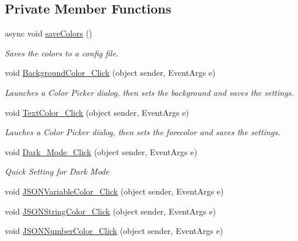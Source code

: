 \subsection*{Private Member Functions}
\begin{DoxyCompactItemize}
\item 
async void \mbox{\hyperlink{class_cert_complete_1_1_preferences_a700e02890b7d9aa6a4425f55c1aee837}{save\+Colors}} ()
\begin{DoxyCompactList}\small\item\em Saves the colors to a config file. \end{DoxyCompactList}\item 
void \mbox{\hyperlink{class_cert_complete_1_1_preferences_a18a2ea14a6e0668ec90c58c17ecf09f2}{Background\+Color\+\_\+\+Click}} (object sender, Event\+Args e)
\begin{DoxyCompactList}\small\item\em Launches a Color Picker dialog, then sets the background and saves the settings. \end{DoxyCompactList}\item 
void \mbox{\hyperlink{class_cert_complete_1_1_preferences_a7e222d82f4196b988bbbc57d81558aeb}{Text\+Color\+\_\+\+Click}} (object sender, Event\+Args e)
\begin{DoxyCompactList}\small\item\em Lauches a Color Picker dialog, then sets the forecolor and saves the settings. \end{DoxyCompactList}\item 
void \mbox{\hyperlink{class_cert_complete_1_1_preferences_ac4075ddbcd2bd199e12a80d238baabb1}{Dark\+\_\+\+Mode\+\_\+\+Click}} (object sender, Event\+Args e)
\begin{DoxyCompactList}\small\item\em Quick Setting for Dark Mode \end{DoxyCompactList}\item 
void \mbox{\hyperlink{class_cert_complete_1_1_preferences_a55b9692c6c0dcf42b9eef404f74b6497}{J\+S\+O\+N\+Variable\+Color\+\_\+\+Click}} (object sender, Event\+Args e)
\item 
void \mbox{\hyperlink{class_cert_complete_1_1_preferences_a346e95d6b3579179169970a15806c641}{J\+S\+O\+N\+String\+Color\+\_\+\+Click}} (object sender, Event\+Args e)
\item 
void \mbox{\hyperlink{class_cert_complete_1_1_preferences_ae642b7a6aa713898c440fbd9d71267ed}{J\+S\+O\+N\+Number\+Color\+\_\+\+Click}} (object sender, Event\+Args e)

\end{DoxyCompactItemize}
